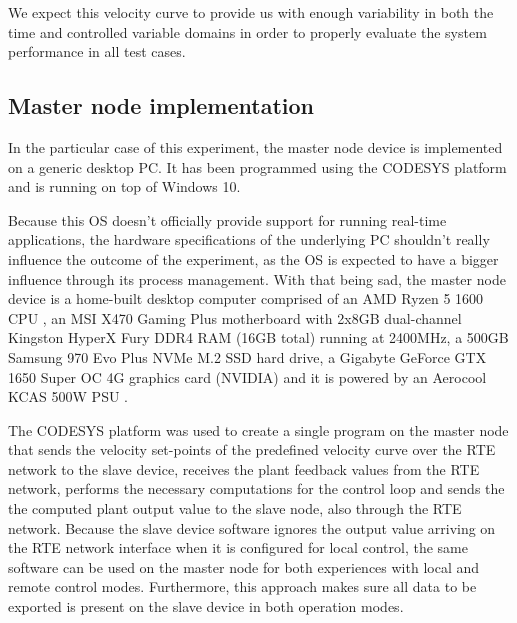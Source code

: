 We expect this velocity curve to provide us with enough variability in both the time and controlled variable domains in order to properly evaluate the system performance in all test cases.


\subsection{Master node implementation}
In the particular case of this experiment, the master node device is implemented on a generic desktop PC.
It has been programmed using the CODESYS platform and is running on top of Windows 10\texttrademark{}.

Because this OS doesn't officially provide support for running real-time applications, the hardware specifications of the underlying PC shouldn't really influence the outcome of the experiment, as the OS is expected to have a bigger influence through its process management.
With that being sad, the master node device is a home-built desktop computer comprised of an AMD Ryzen\texttrademark{} 5 1600 CPU \cite{hdw:ryzen5-1600}, an MSI X470 Gaming Plus \cite{hdw:msi-x470} motherboard with 2x8GB dual-channel Kingston HyperX Fury DDR4 RAM (16GB total) \cite{hdw:hyperx-fury-8gb-ddr4-2400} running at 2400MHz, a 500GB Samsung 970 Evo Plus NVMe\textregistered{} M.2 SSD \cite{hdw:970evo-plus-ssd} hard drive, a Gigabyte GeForce\textregistered{} GTX 1650 Super\texttrademark{} OC 4G \cite{hdw:gigabyte-1650-super-oc} graphics card (NVIDIA) and it is powered by an Aerocool KCAS 500W PSU \cite{hdw:kcas-500w}.

The CODESYS platform was used to create a single program on the master node that sends the velocity set-points of the predefined velocity curve over the RTE network to the slave device, receives the plant feedback values from the RTE network, performs the necessary computations for the control loop and sends the the computed plant output value to the slave node, also through the RTE network.
Because the slave device software ignores the output value arriving on the RTE network interface when it is configured for local control, the same software can be used on the master node for both experiences with local and remote control modes.
Furthermore, this approach makes sure all data to be exported is present on the slave device in both operation modes.

